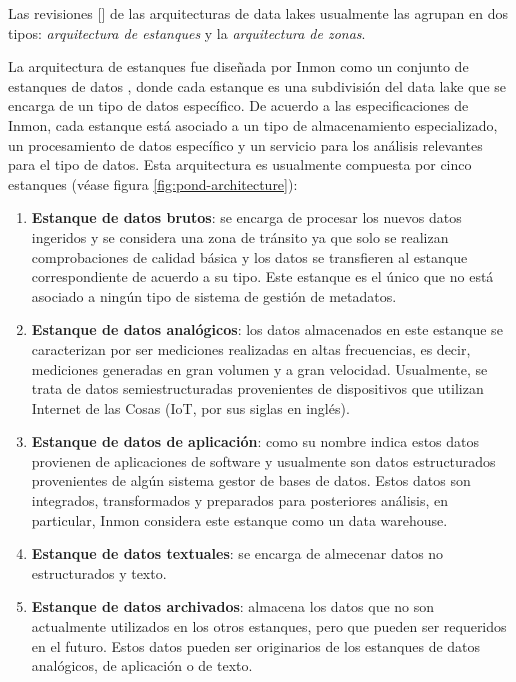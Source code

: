 Las revisiones [\cite*{giebler2019leveraging,ravat2019data}] de las arquitecturas de data lakes usualmente las agrupan en dos tipos: \textit{arquitectura de estanques} y la \textit{arquitectura de zonas}.

La arquitectura de estanques fue diseñada por Inmon como un conjunto de estanques de datos \cite{inmon2016data}, donde cada estanque es una
subdivisión del data lake que se encarga de un tipo de datos específico. De acuerdo a las especificaciones de Inmon, cada
estanque está asociado a un tipo de almacenamiento especializado, un procesamiento de datos específico y un servicio para los análisis
relevantes para el tipo de datos. Esta arquitectura es usualmente compuesta por cinco estanques (véase figura \ref{fig:pond-architecture}):

\begin{enumerate}
    \item \textbf{Estanque de datos brutos}: se encarga de procesar los nuevos datos ingeridos y se considera una
    zona de tránsito ya que solo se realizan comprobaciones de calidad básica y los datos se transfieren al estanque
    correspondiente de acuerdo a su tipo. Este estanque es el único que no está asociado a ningún tipo de sistema de gestión de metadatos.
    \item \textbf{Estanque de datos analógicos}: los datos almacenados en este estanque se caracterizan por ser mediciones realizadas en altas frecuencias, es decir,
    mediciones generadas en gran volumen y a gran velocidad. Usualmente, se trata de datos semiestructuradas provenientes de dispositivos
    que utilizan Internet de las Cosas (IoT, por sus siglas en inglés).
    \item \textbf{Estanque de datos de aplicación}: como su nombre indica estos datos provienen de aplicaciones de software y usualmente son datos
    estructurados provenientes de algún sistema gestor de bases de datos. Estos datos son integrados, transformados y preparados para posteriores
    análisis, en particular, Inmon considera este estanque como un data warehouse.
    \item \textbf{Estanque de datos textuales}: se encarga de almecenar datos no estructurados y texto.
    \item \textbf{Estanque de datos archivados}: almacena los datos que no son actualmente utilizados en los otros estanques, pero que pueden
    ser requeridos en el futuro. Estos datos pueden ser originarios de los estanques de datos analógicos, de aplicación o de texto.
\end{enumerate}


